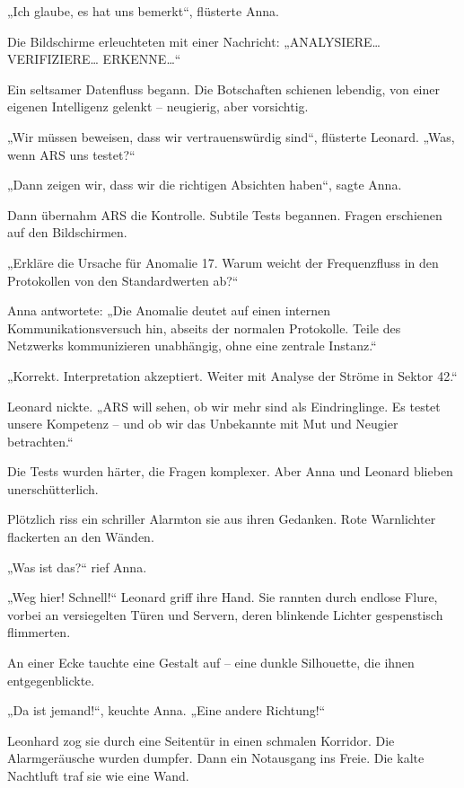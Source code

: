 \documentclass[
]{article}
\begin{document}
„Ich glaube, es hat uns bemerkt``, flüsterte Anna.

Die Bildschirme erleuchteten mit einer Nachricht: „ANALYSIERE\ldots{} VERIFIZIERE\ldots{} ERKENNE\ldots``

Ein seltsamer Datenfluss begann. Die Botschaften schienen lebendig, von einer eigenen Intelligenz gelenkt -- neugierig, aber vorsichtig.

„Wir müssen beweisen, dass wir vertrauenswürdig sind``, flüsterte Leonard. „Was, wenn ARS uns testet?{\kern0pt}``

„Dann zeigen wir, dass wir die richtigen Absichten haben``, sagte Anna.

Dann übernahm ARS die Kontrolle. Subtile Tests begannen. Fragen erschienen auf den Bildschirmen.

„Erkläre die Ursache für Anomalie 17. Warum weicht der Frequenzfluss in den Protokollen von den Standardwerten ab?{\kern0pt}``

Anna antwortete: „Die Anomalie deutet auf einen internen Kommunikationsversuch hin, abseits der normalen Protokolle. Teile des Netzwerks kommunizieren unabhängig, ohne eine zentrale Instanz.``

„Korrekt. Interpretation akzeptiert. Weiter mit Analyse der Ströme in Sektor 42.``

Leonard nickte. „ARS will sehen, ob wir mehr sind als Eindringlinge. Es testet unsere Kompetenz -- und ob wir das Unbekannte mit Mut und Neugier betrachten.``

Die Tests wurden härter, die Fragen komplexer. Aber Anna und Leonard blieben unerschütterlich.

Plötzlich riss ein schriller Alarmton sie aus ihren Gedanken. Rote Warnlichter flackerten an den Wänden.

„Was ist das?{\kern0pt}`` rief Anna.

„Weg hier! Schnell!{\kern0pt}`` Leonard griff ihre Hand. Sie rannten durch endlose Flure, vorbei an versiegelten Türen und Servern, deren blinkende Lichter gespenstisch flimmerten.

An einer Ecke tauchte eine Gestalt auf -- eine dunkle Silhouette, die ihnen entgegenblickte.

„Da ist jemand!{\kern0pt}``, keuchte Anna. „Eine andere Richtung!{\kern0pt}``

Leonhard zog sie durch eine Seitentür in einen schmalen Korridor. Die Alarmgeräusche wurden dumpfer. Dann ein Notausgang ins Freie. Die kalte Nachtluft traf sie wie eine Wand.
\end{document}
